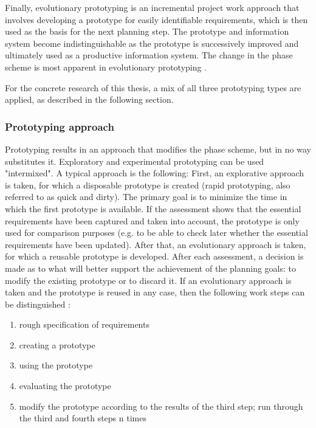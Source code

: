 Finally, evolutionary prototyping is an incremental project work approach that involves developing 
a prototype for easily identifiable requirements, which is then used as the basis for the next planning step. 
The prototype and information system become indistinguishable as the prototype is successively improved 
and ultimately used as a productive information system. 
The change in the phase scheme is most apparent in evolutionary prototyping
\autocite{riedlManagementInformatik2019}.

For the concrete research of this thesis,
a mix of all three prototyping types are applied,
as described in the following section.

\subsubsection*{Prototyping approach}

Prototyping results in an approach that modifies the phase scheme, but in no way substitutes it. Exploratory and experimental prototyping can be used "intermixed". A typical approach is the following: First, an explorative approach is taken, for which a disposable prototype is created (rapid prototyping, also referred to as quick and dirty). The primary goal is to minimize the time in which the first prototype is available. If the assessment shows that the essential requirements have been captured and taken into account, the prototype is only used for comparison purposes (e.g. to be able to check later whether the essential requirements have been updated). After that, an evolutionary approach is taken, for which a reusable prototype is developed. After each assessment, a decision is made as to what will better support the achievement of the planning goals: to modify the existing prototype or to discard it. If an evolutionary approach is taken and the prototype is reused in any case, then the following work steps can be distinguished
\autocite{riedlManagementInformatik2019}:

\begin{enumerate}
	\item rough specification of requirements
	\item creating a prototype
	\item using the prototype
	\item evaluating the prototype
	\item modify the prototype according to the results of the third step; run through the third and fourth steps n times
\end{enumerate}

